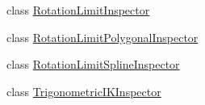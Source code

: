 \begin{DoxyCompactItemize}
\item 
class \mbox{\hyperlink{class_root_motion_1_1_final_i_k_1_1_rotation_limit_inspector}{Rotation\+Limit\+Inspector}}
\item 
class \mbox{\hyperlink{class_root_motion_1_1_final_i_k_1_1_rotation_limit_polygonal_inspector}{Rotation\+Limit\+Polygonal\+Inspector}}
\item 
class \mbox{\hyperlink{class_root_motion_1_1_final_i_k_1_1_rotation_limit_spline_inspector}{Rotation\+Limit\+Spline\+Inspector}}
\item 
class \mbox{\hyperlink{class_root_motion_1_1_final_i_k_1_1_trigonometric_i_k_inspector}{Trigonometric\+I\+K\+Inspector}}
\end{DoxyCompactItemize}
